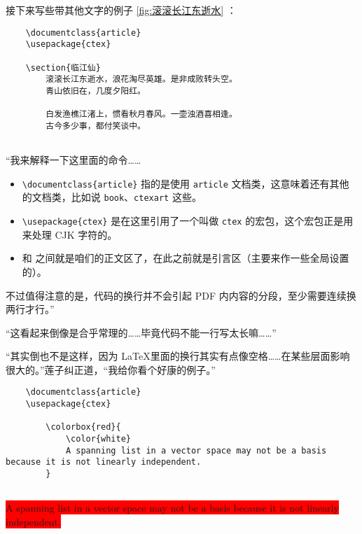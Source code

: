 接下来写些带其他文字的例子 \autoref{fig:滚滚长江东逝水} ：


\begin{lstlisting}
    \documentclass{article}
    \usepackage{ctex}
    
    \section{临江仙}
        滚滚长江东逝水，浪花淘尽英雄。是非成败转头空。
        青山依旧在，几度夕阳红。

        白发渔樵江渚上，惯看秋月春风。一壶浊酒喜相逢。
        古今多少事，都付笑谈中。    
    
\end{lstlisting}


“我来解释一下这里面的命令……

\begin{itemize}
    \item \verb"\documentclass{article}" 指的是使用 \verb"article" 文档类，这意味着还有其他的文档类，比如说 \verb"book"、\verb"ctexart" 这些。
    \item \verb"\usepackage{ctex}" 是在这里引用了一个叫做 \verb"ctex" 的宏包，这个宏包正是用来处理 CJK 字符的。
    \item \verb"" 和 \verb"" 之间就是咱们的正文区了，在此之前就是引言区（主要来作一些全局设置的）。
\end{itemize}

不过值得注意的是，代码的换行并不会引起 PDF 内内容的分段，至少需要连续换两行才行。”

“这看起来倒像是合乎常理的……毕竟代码不能一行写太长嘛……”

“其实倒也不是这样，因为 \LaTeX 里面的换行其实有点像空格……在某些层面影响很大的。”莲子纠正道，“我给你看个好康的例子。”


\begin{lstlisting}
    \documentclass{article}
    \usepackage{ctex}
    
        \colorbox{red}{
            \color{white} 
            A spanning list in a vector space may not be a basis because it is not linearly independent.
        }
    
\end{lstlisting}

\begin{center}\footnotesize
    \colorbox{red}{
        \color{white}
        A spanning list in a vector space may not be a basis because it is not linearly independent.
    }
\end{center}

